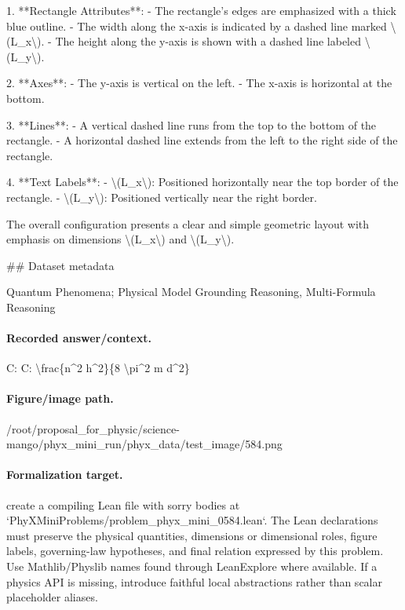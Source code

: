 1. **Rectangle Attributes**:
   - The rectangle's edges are emphasized with a thick blue outline.
   - The width along the x-axis is indicated by a dashed line marked \textbackslash{}(L\_x\textbackslash{}).
   - The height along the y-axis is shown with a dashed line labeled \textbackslash{}(L\_y\textbackslash{}).

2. **Axes**:
   - The y-axis is vertical on the left.
   - The x-axis is horizontal at the bottom.

3. **Lines**:
   - A vertical dashed line runs from the top to the bottom of the rectangle.
   - A horizontal dashed line extends from the left to the right side of the rectangle.

4. **Text Labels**:
   - \textbackslash{}(L\_x\textbackslash{}): Positioned horizontally near the top border of the rectangle.
   - \textbackslash{}(L\_y\textbackslash{}): Positioned vertically near the right border.

The overall configuration presents a clear and simple geometric layout with emphasis on dimensions \textbackslash{}(L\_x\textbackslash{}) and \textbackslash{}(L\_y\textbackslash{}).

\#\# Dataset metadata

Quantum Phenomena; Physical Model Grounding Reasoning, Multi-Formula Reasoning

\paragraph{Recorded answer/context.}
C: C: \textbackslash{}frac\{n\textasciicircum{}2 h\textasciicircum{}2\}\{8 \textbackslash{}pi\textasciicircum{}2 m d\textasciicircum{}2\}

\paragraph{Figure/image path.}
/root/proposal\_for\_physic/science-mango/phyx\_mini\_run/phyx\_data/test\_image/584.png

\paragraph{Formalization target.}
create a compiling Lean file with sorry bodies at `PhyXMiniProblems/problem\_phyx\_mini\_0584.lean`. The Lean declarations must preserve the physical quantities, dimensions or dimensional roles, figure labels, governing-law hypotheses, and final relation expressed by this problem.
Use Mathlib/Physlib names found through LeanExplore where available. If a physics API is missing, introduce faithful local abstractions rather than scalar placeholder aliases.


